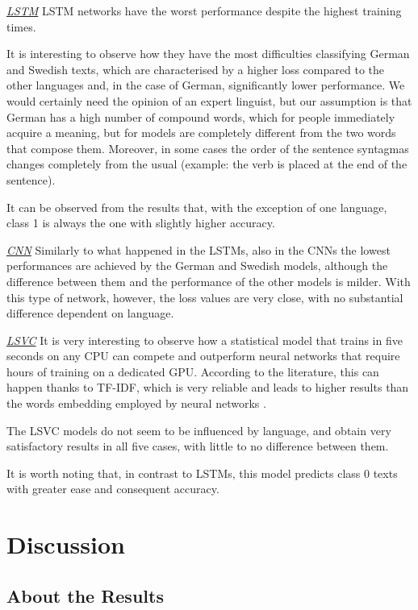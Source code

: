 \documentclass[letterpaper,11pt]{article}
\begin{document}
\underline{\textit{LSTM}} LSTM networks have the worst performance despite the highest training times. 

It is interesting to observe how they have the most difficulties classifying German and Swedish texts, which are characterised by a higher loss compared to the other languages and, in the case of German, significantly lower performance. We would certainly need the opinion of an expert linguist, but our assumption is that German has a high number of compound words, which for people immediately acquire a meaning, but for models are completely different from the two words that compose them. Moreover, in some cases the order of the sentence syntagmas changes completely from the usual (example: the verb is placed at the end of the sentence).

It can be observed from the results that, with the exception of one language, class 1 is always the one with slightly higher accuracy.

\underline{\textit{CNN}} Similarly to what happened in the LSTMs, also in the CNNs the lowest performances are achieved by the German and Swedish models, although the difference between them and the performance of the other models is milder. With this type of network, however, the loss values are very close, with no substantial difference dependent on language.

\underline{\textit{LSVC}} It is very interesting to observe how a statistical model that trains in five seconds on any CPU can compete and outperform neural networks that require hours of training on a dedicated GPU. According to the literature, this can happen thanks to TF-IDF, which is very reliable and leads to higher results than the words embedding employed by neural networks \cite{cahyani2021performance}.

The LSVC models do not seem to be influenced by language, and obtain very satisfactory results in all five cases, with little to no difference between them.

It is worth noting that, in contrast to LSTMs, this model predicts class 0 texts with greater ease and consequent accuracy.

\section{Discussion}

\subsection{About the Results}
\end{document}
